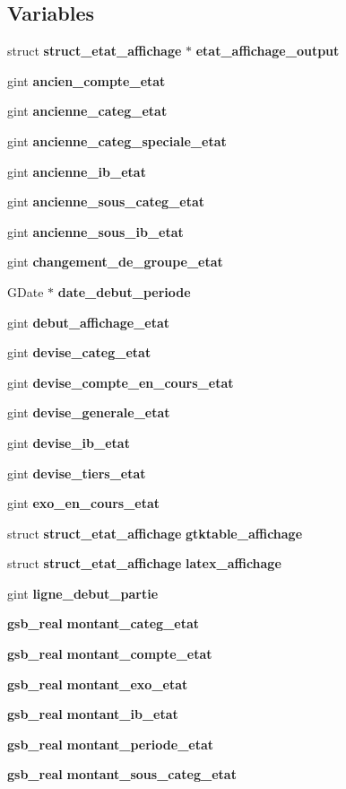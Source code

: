 \subsection*{Variables}
\begin{DoxyCompactItemize}
\item 
struct {\bf struct\_\-etat\_\-affichage} $\ast$ {\bf etat\_\-affichage\_\-output}
\item 
gint {\bf ancien\_\-compte\_\-etat}
\item 
gint {\bf ancienne\_\-categ\_\-etat}
\item 
gint {\bf ancienne\_\-categ\_\-speciale\_\-etat}
\item 
gint {\bf ancienne\_\-ib\_\-etat}
\item 
gint {\bf ancienne\_\-sous\_\-categ\_\-etat}
\item 
gint {\bf ancienne\_\-sous\_\-ib\_\-etat}
\item 
gint {\bf changement\_\-de\_\-groupe\_\-etat}
\item 
GDate $\ast$ {\bf date\_\-debut\_\-periode}
\item 
gint {\bf debut\_\-affichage\_\-etat}
\item 
gint {\bf devise\_\-categ\_\-etat}
\item 
gint {\bf devise\_\-compte\_\-en\_\-cours\_\-etat}
\item 
gint {\bf devise\_\-generale\_\-etat}
\item 
gint {\bf devise\_\-ib\_\-etat}
\item 
gint {\bf devise\_\-tiers\_\-etat}
\item 
gint {\bf exo\_\-en\_\-cours\_\-etat}
\item 
struct {\bf struct\_\-etat\_\-affichage} {\bf gtktable\_\-affichage}
\item 
struct {\bf struct\_\-etat\_\-affichage} {\bf latex\_\-affichage}
\item 
gint {\bf ligne\_\-debut\_\-partie}
\item 
{\bf gsb\_\-real} {\bf montant\_\-categ\_\-etat}
\item 
{\bf gsb\_\-real} {\bf montant\_\-compte\_\-etat}
\item 
{\bf gsb\_\-real} {\bf montant\_\-exo\_\-etat}
\item 
{\bf gsb\_\-real} {\bf montant\_\-ib\_\-etat}
\item 
{\bf gsb\_\-real} {\bf montant\_\-periode\_\-etat}
\item 
{\bf gsb\_\-real} {\bf montant\_\-sous\_\-categ\_\-etat}
\item 

\end{DoxyCompactItemize}
